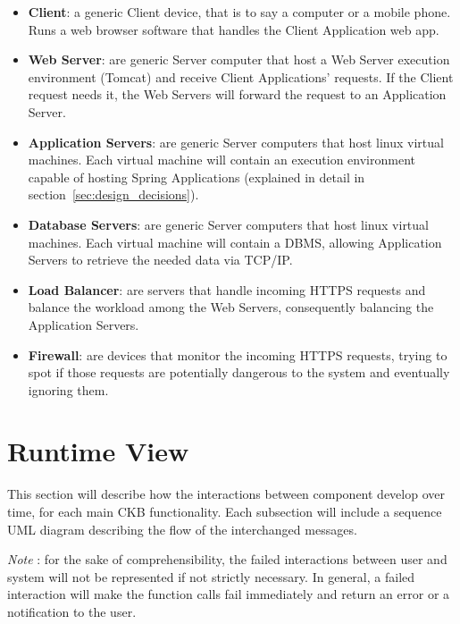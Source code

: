 \documentclass[11pt]{report}
\begin{document}
\begin{itemize}
    \item \textbf{Client}: a generic Client device, that is to say a computer or a mobile phone.
    Runs a web browser software that handles the Client Application web app.
    \item \textbf{Web Server}: are generic Server computer that host a Web Server execution environment (Tomcat) and receive Client Applications' requests.
    If the Client request needs it, the Web Servers will forward the request to an Application Server.
    \item \textbf{Application Servers}: are generic Server computers that host linux virtual machines.
    Each virtual machine will contain an execution environment capable of hosting Spring Applications (explained in detail in section~\ref{sec:design_decisions}).
    \item \textbf{Database Servers}: are generic Server computers that host linux virtual machines.
    Each virtual machine will contain a DBMS, allowing Application Servers to retrieve the needed data via TCP/IP\@.
    \item \textbf{Load Balancer}: are servers that handle incoming HTTPS requests and balance the workload among the Web Servers, consequently balancing the Application Servers.
   \item \textbf{Firewall}: are devices that monitor the incoming HTTPS requests, trying to spot if those requests are potentially dangerous to the system and eventually ignoring them.
\end{itemize}

\cleardoublepage
\section{Runtime View} \label{sec:runtime_view}
This section will describe how the interactions between component develop over time, for each main CKB functionality.
Each subsection will include a sequence UML diagram describing the flow of the interchanged messages.

\emph{Note} : for the sake of comprehensibility, the failed interactions between user and system will not be represented if not strictly necessary.
In general, a failed interaction will make the function calls fail immediately and return an error or a notification to the user.
\end{document}
